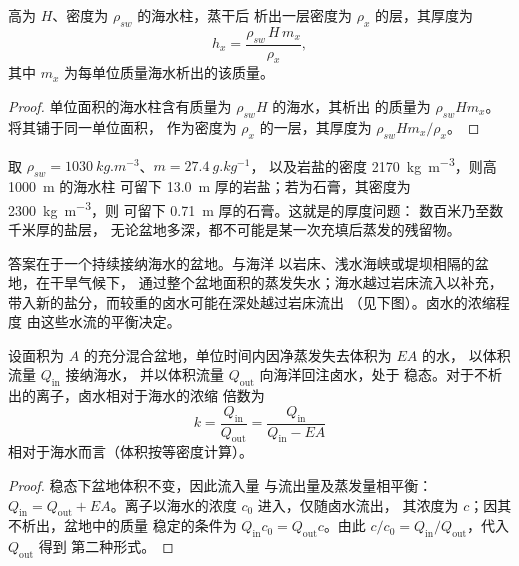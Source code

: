 \begin{proposition}[海水柱中的盐]\label{prop:b1:chemical-biogenic-sediments:column}
高为 $H$、密度为 $\rho_{sw}$ 的海水柱，蒸干后
析出一层密度为 $\rho_x$ 的层，其厚度为
\[
h_x = \frac{\rho_{sw}\,H\,m_x}{\rho_x},
\]
其中 $m_x$ 为每单位质量海水析出的该质量。
\end{proposition}

\begin{proof}
单位面积的海水柱含有质量为 $\rho_{sw}H$ 的海水，其析出
的质量为 $\rho_{sw}Hm_x$。将其铺于同一单位面积，
作为密度为 $\rho_x$ 的一层，其厚度为 $\rho_{sw}Hm_x/\rho_x$。
\end{proof}

取 $\rho_{sw} = \qty{1030}{kg.m^{-3}}$、$m = \qty{27.4}{g.kg^{-1}}$，
以及岩盐的密度 \qty{2170}{kg.m^{-3}}，则高 \qty{1000}{m} 的海水柱
可留下 \qty{13.0}{m} 厚的岩盐；若为石膏，其密度为 \qty{2300}{kg.m^{-3}}，则
可留下 \qty{0.71}{m} 厚的石膏。这就是的厚度问题：
数百米乃至数千米厚的盐层，
无论盆地多深，都不可能是某一次充填后蒸发的残留物。

答案在于一个持续接纳海水的盆地。与海洋
以岩床、浅水海峡或堤坝相隔的盆地，在干旱气候下，
通过整个盆地面积的蒸发失水；海水越过岩床流入以补充，
带入新的盐分，而较重的卤水可能在深处越过岩床流出
（见下图）。卤水的浓缩程度
由这些水流的平衡决定。

\begin{proposition}[有障壁的盆地]\label{prop:b1:chemical-biogenic-sediments:barred}
设面积为 $A$ 的充分混合盆地，单位时间内因净蒸发失去体积为 $EA$ 的水，
以体积流量 $Q_{\mathrm{in}}$ 接纳海水，
并以体积流量 $Q_{\mathrm{out}}$ 向海洋回注卤水，处于
稳态。对于不析出的离子，卤水相对于海水的浓缩
倍数为
\[
k = \frac{Q_{\mathrm{in}}}{Q_{\mathrm{out}}} = \frac{Q_{\mathrm{in}}}{Q_{\mathrm{in}} - EA}
\]
相对于海水而言（体积按等密度计算）。
\end{proposition}

\begin{proof}
稳态下盆地体积不变，因此流入量
与流出量及蒸发量相平衡：$Q_{\mathrm{in}} = Q_{\mathrm{out}} +
EA$。离子以海水的浓度 $c_0$ 进入，仅随卤水流出，
其浓度为 $c$；因其不析出，盆地中的质量
稳定的条件为 $Q_{\mathrm{in}}c_0 = Q_{\mathrm{out}}c$。由此 $c/c_0 =
Q_{\mathrm{in}}/Q_{\mathrm{out}}$，代入 $Q_{\mathrm{out}}$ 得到
第二种形式。
\end{proof}

